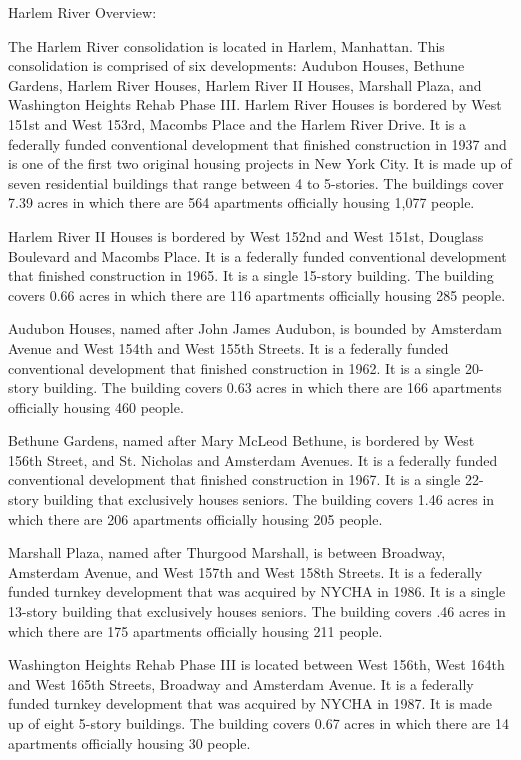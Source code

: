 Harlem River Overview:

The Harlem River consolidation is located in Harlem, Manhattan. This consolidation is comprised of six developments: Audubon Houses, Bethune Gardens, Harlem River Houses, Harlem River II Houses, Marshall Plaza, and Washington Heights Rehab Phase III. Harlem River Houses is bordered by West 151st and West 153rd, Macombs Place and the Harlem River Drive. It is a federally funded conventional development that finished construction in 1937 and is one of the first two original housing projects in New York City. It is made up of seven residential buildings that range between 4 to 5-stories. The buildings cover 7.39 acres in which there are 564 apartments officially housing 1,077 people. 

Harlem River II Houses is bordered by West 152nd and West 151st, Douglass Boulevard and Macombs Place. It is a federally funded conventional development that finished construction in 1965. It is a single 15-story building. The building covers 0.66 acres in which there are 116 apartments officially housing 285 people. 

Audubon Houses, named after John James Audubon, is bounded by Amsterdam Avenue and West 154th and West 155th Streets. It is a federally funded conventional development that finished construction in 1962. It is a single 20-story building. The building covers 0.63 acres in which there are 166 apartments officially housing 460 people. 

Bethune Gardens, named after Mary McLeod Bethune, is bordered by West 156th Street, and St. Nicholas and Amsterdam Avenues. It is a federally funded conventional development that finished construction in 1967. It is a single 22-story building that exclusively houses seniors. The building covers 1.46 acres in which there are 206 apartments officially housing 205 people.

Marshall Plaza, named after Thurgood Marshall, is between Broadway, Amsterdam Avenue, and West 157th and West 158th Streets. It is a federally funded turnkey development that was acquired by NYCHA in 1986. It is a single 13-story building that exclusively houses seniors. The building covers .46 acres in which there are 175 apartments officially housing 211 people.

Washington Heights Rehab Phase III is located between West 156th, West 164th and West 165th Streets, Broadway and Amsterdam Avenue. It is a federally funded turnkey development that was acquired by NYCHA in 1987. It is made up of eight 5-story buildings. The building covers 0.67 acres in which there are 14 apartments officially housing 30 people. 